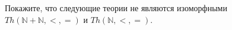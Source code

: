 Покажите, что следующие теории не являются изоморфными $Th(\mathbb{N} + \mathbb{N}, <, =)$ и $Th(\mathbb{N}, <, =)$.